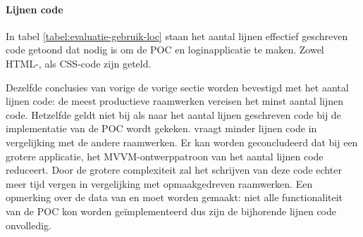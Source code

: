 \paragraph{Lijnen code} 
In tabel \ref{tabel:evaluatie-gebruik-loc} staan het aantal lijnen effectief geschreven code getoond dat nodig is om de POC en loginapplicatie te maken.
Zowel HTML-, \js{} als CSS-code zijn geteld.

Dezelfde conclusies van vorige de vorige sectie worden bevestigd met het aantal lijnen code:  de meest productieve raamwerken vereisen het minst aantal lijnen code.
Hetzelfde geldt niet bij als naar het aantal lijnen geschreven code bij de implementatie van de POC wordt gekeken.
\kendo{} vraagt minder lijnen code in vergelijking met de andere raamwerken.
Er kan worden geconcludeerd dat bij een grotere applicatie,  het MVVM-ontwerppatroon van \kendo{} het aantal lijnen code reduceert.
Door de grotere complexiteit zal het schrijven van deze code echter meer tijd vergen in vergelijking met opmaakgedreven raamwerken.
Een opmerking over de data van \st{} en \lungo{} moet worden gemaakt:  niet alle functionaliteit van de POC kon worden geïmplementeerd dus zijn de bijhorende lijnen code onvolledig.

\begin{table}
\centering
{}
\caption{Aantal lijnen effectief geschreven code.}
\label{tabel:evaluatie-gebruik-loc}
\end{table}

